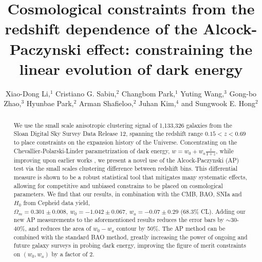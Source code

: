 \documentclass[prl,twocolumn,superscriptaddress,aps,amsmath,amssymb,nofootinbib,altaffilletter]{revtex4}
\begin{document}
\title{Cosmological constraints from the redshift dependence of the Alcock-Paczynski effect: 
constraining the linear evolution of dark energy}

\author{ 
Xiao-Dong Li,$^{1}$
Cristiano G. Sabiu,$^{2}$
Changbom Park,$^{1}$
Yuting Wang,$^{3}$
Gong-bo Zhao,$^{3}$
Hyunbae Park,$^{2}$
Arman Shafieloo,$^{2}$
Juhan Kim,$^{4}$
and Sungwook E. Hong$^{2}$}


\begin{abstract}
We use the small scale anisotropic clustering signal of 1,133,326 galaxies from the Sloan Digital Sky Survey Data Release 
12, spanning the redshift range $0.15<z<0.69$ to place constraints on the expansion history of the Universe. 
Concentrating on the Chevallier-Polarski-Linder parametrization of dark energy, $w=w_0+w_a\frac{z}{1+z}$,
while improving upon earlier works \citep{Li2016}, 
we present a novel use of the Alcock-Paczynski (AP) test via the small scales clustering difference between redshift bins. 
This differential measure is shown to be a robust statistical tool that mitigates many systematic effects, 
allowing for competitive and unbiased constrains to be placed on cosmological parameters.
We find that our results, in combination with the CMB, BAO, SNIa and $H_0$ from Cepheid data yield, 
$\Omega_m = 0.301 \pm 0.008,\ w_0 = -1.042 \pm 0.067,\ w_a = -0.07 \pm 0.29$ (68.3\% CL). 
Adding our new AP measurements to the aforementioned results 
reduces the error bars by $\sim$30-40\%,
and reduces the area of $w_0-w_a$ contour by 50\%.
The AP method can be combined with the standard BAO method,
greatly increasing the power of ongoing and future galaxy surveys in probing dark energy, 
improving the figure of merit constraints on $(w_0,w_a)$ by a factor of 2. 
\end{abstract}

\maketitle
\end{document}
